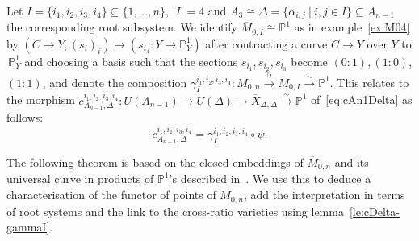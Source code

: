 \documentclass[ALCO,ThmDefs,Unicode,epreuves]{cedram}
\def\P{\mathds P}
\begin{document}
\begin{lemma}\label{le:cDelta-gammaI}
Let $I=\{i_1,i_2,i_3,i_4\}\subseteq\{1,\ldots,n\}$, $|I|=4$ and 
$A_3\cong\Delta=\{\alpha_{i,j}\:|\:i,j\in I\}\subseteq A_{n-1}$ 
the corresponding root subsystem. We identify 
$\overline{M}_{0,I}\cong\P^1$ as in example~\ref{ex:M04} by 
$(C\to Y,(s_i)_i)\mapsto(s_{i_4}\colon Y\to\P^1_Y)$ after contracting a curve $C\to Y$ 
over $Y$ to $\,\P^1_Y$ and choosing a basis such that the sections 
$s_{i_1},s_{i_2},s_{i_3}$ become $(0:1),(1:0)$, %
$(1:1)$, and denote the composition
$\gamma_I^{i_1,i_2,i_3,i_4}\colon\overline{M}_{0,n}\stackrel{\!\!\gamma_I\:}{\to}
\overline{M}_{0,I}\stackrel{\sim}{\to}\P^1$.
This relates to the morphism $c_{A_{n-1},\Delta}^{i_1,i_2,i_3,i_4}\colon 
U(A_{n-1})\to U(\Delta)\to\overline{X}_{\Delta,\Delta}\stackrel{\sim}{\to}\P^1$ 
of~\eqref{eq:cAn1Delta} as follows:
\[
c_{A_{n-1},\Delta}^{i_1,i_2,i_3,i_4}=\gamma_I^{i_1,i_2,i_3,i_4}\circ\psi.
\]
\end{lemma}



The following theorem is based on the closed embeddings of $\overline{M}_{0,n}$
and its universal curve in products of $\P^1$'s described in~\cite[Prop.~4]{GHP88}. 
We use this to deduce a characterisation of the functor of points of $\overline{M}_{0,n}$, 
add the interpretation in terms of root systems and the link to the cross-ratio 
varieties using lemma~\ref{le:cDelta-gammaI}.
\end{document}
